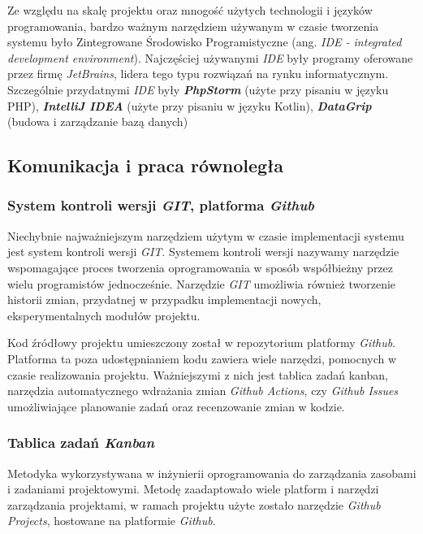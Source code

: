 Ze względu na skalę projektu oraz mnogość użytych technologii i języków programowania, bardzo ważnym narzędziem używanym w czasie tworzenia systemu było Zintegrowane Środowisko Programistyczne (ang. \textit{IDE - integrated development environment}). Najczęściej używanymi \textit{IDE} były programy oferowane przez firmę \textit{JetBrains}, lidera tego typu rozwiązań na rynku informatycznym. Szczególnie przydatnymi \textit{IDE} były \textbf{\textit{PhpStorm}} (użyte przy pisaniu w języku PHP), \textbf{\textit{IntelliJ IDEA}} (użyte przy pisaniu w języku Kotlin), \textbf{\textit{DataGrip}} (budowa i zarządzanie bazą danych)

\subsection{Komunikacja i praca równoległa}

\subsubsection{System kontroli wersji \textit{GIT}, platforma \textit{Github}}

Niechybnie najważniejszym narzędziem użytym w czasie implementacji systemu jest system kontroli wersji \textit{GIT}. Systemem kontroli wersji nazywamy narzędzie wspomagające proces tworzenia oprogramowania w sposób współbieżny przez wielu programistów jednocześnie. Narzędzie \textit{GIT} umożliwia również tworzenie historii zmian, przydatnej w przypadku implementacji nowych, eksperymentalnych modułów projektu. 

Kod źródłowy projektu umieszczony został w repozytorium platformy \textit{Github}. Platforma ta poza udostępnianiem kodu zawiera wiele narzędzi, pomocnych w czasie realizowania projektu.  Ważniejszymi z nich jest tablica zadań kanban, narzędzia automatycznego wdrażania zmian \textit{Github Actions}, czy \textit{Github Issues} umożliwiające planowanie zadań oraz recenzowanie zmian w kodzie.

\subsubsection{Tablica zadań \textit{Kanban}}

Metodyka wykorzystywana w inżynierii oprogramowania do zarządzania zasobami i zadaniami projektowymi. Metodę zaadaptowało wiele platform i narzędzi zarządzania projektami, w ramach projektu użyte zostało narzędzie \textit{Github Projects}, hostowane na platformie \textit{Github}.

